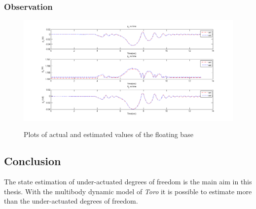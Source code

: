 \subsubsection{Observation}
\begin{figure}
    \centering
    \includegraphics[trim=30mm 0mm 20mm 0mm,clip,scale=0.4]{Bilder/plots/toro/toro_pos.png}
    \label{fig:toro_pos}
    \caption{Plots of actual and estimated values of the floating base}
\end{figure}

\subsection{Conclusion}
The state estimation of under-actuated degrees of freedom is the main aim in this thesis. With the multibody dynamic model of \emph{Toro} it is possible to estimate more than the under-actuated degrees of freedom.